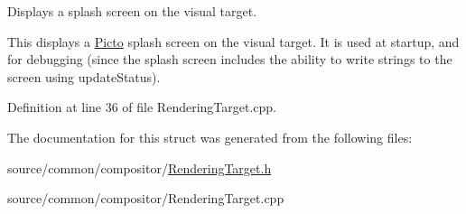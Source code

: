 Displays a splash screen on the visual target. 

This displays a \hyperlink{namespace_picto}{Picto} splash screen on the visual target. It is used at startup, and for debugging (since the splash screen includes the ability to write strings to the screen using update\-Status). 

Definition at line 36 of file Rendering\-Target.\-cpp.



The documentation for this struct was generated from the following files\-:\begin{DoxyCompactItemize}
\item 
source/common/compositor/\hyperlink{_rendering_target_8h}{Rendering\-Target.\-h}\item 
source/common/compositor/Rendering\-Target.\-cpp\end{DoxyCompactItemize}
